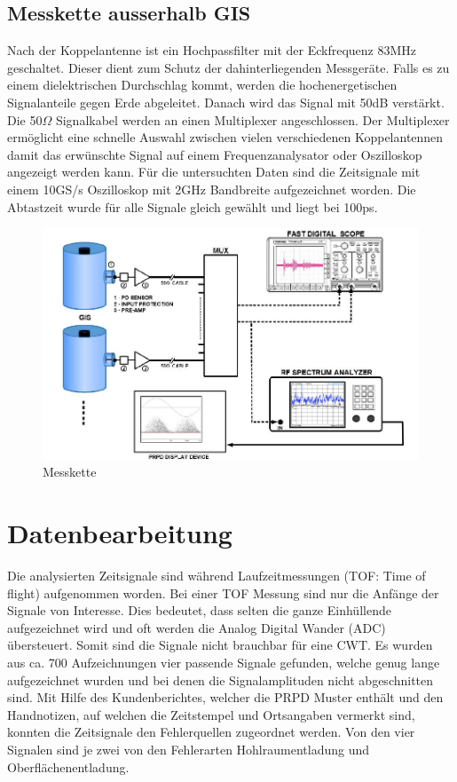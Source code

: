\begin{refsection}
\subsection{Messkette ausserhalb GIS}
Nach der Koppelantenne ist ein Hochpassfilter mit der Eckfrequenz 83MHz geschaltet.
Dieser dient zum Schutz der dahinterliegenden Messgeräte.
Falls es zu einem dielektrischen Durchschlag kommt, werden die hochenergetischen Signalanteile gegen Erde abgeleitet.
Danach wird das Signal mit 50dB verstärkt.
Die 50$\Omega$ Signalkabel werden an einen Multiplexer angeschlossen. 
Der Multiplexer ermöglicht eine schnelle Auswahl zwischen vielen verschiedenen Koppelantennen damit das erwünschte Signal auf einem Frequenzanalysator oder Oszilloskop angezeigt werden kann. 
Für die untersuchten Daten sind die Zeitsignale mit einem 10GS/s Oszilloskop mit 2GHz Bandbreite aufgezeichnet worden.
Die Abtastzeit wurde für alle Signale gleich gewählt und liegt bei 100ps. 
\begin{figure}
	\centering
	\includegraphics[width=0.9\linewidth]{papers/gis/Bilder/MessketteAusGIS}
	\caption{Messkette \cite{report:ABBOnSite}}
	\label{fig:messketteausgis}
\end{figure}

 
\section{Datenbearbeitung}

Die analysierten Zeitsignale sind während Laufzeitmessungen (TOF: Time of flight) aufgenommen worden. 
Bei einer TOF Messung sind nur die Anfänge der Signale von Interesse.
Dies bedeutet, dass selten die ganze Einhüllende aufgezeichnet wird und oft werden die Analog Digital Wander (ADC) übersteuert. 
Somit sind die Signale nicht brauchbar für eine CWT.
Es wurden aus ca. 700 Aufzeichnungen vier passende Signale gefunden, welche genug lange aufgezeichnet wurden und bei denen die Signalamplituden nicht abgeschnitten sind. 
Mit Hilfe des Kundenberichtes, welcher die PRPD Muster enthält und den Handnotizen, auf welchen die Zeitstempel und Ortsangaben vermerkt sind, konnten die Zeitsignale den Fehlerquellen zugeordnet werden.
Von den vier Signalen sind je zwei von den Fehlerarten Hohlraumentladung und Oberflächenentladung.
\begin{figure}
	\centering
	

\end{figure}
\end{refsection}
